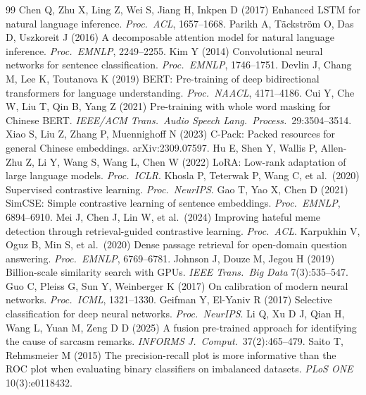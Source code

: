 \documentclass[11pt]{article}
\begin{document}
\begin{thebibliography}{99}
\small
{} Chen Q, Zhu X, Ling Z, Wei S, Jiang H, Inkpen D (2017)
Enhanced LSTM for natural language inference. \textit{Proc.\ ACL}, 1657--1668.
 Parikh A, T\"ackstr\"om O, Das D, Uszkoreit J (2016) A
decomposable attention model for natural language inference. \textit{Proc.\
EMNLP}, 2249--2255.
 Kim Y (2014) Convolutional neural networks for sentence
classification. \textit{Proc.\ EMNLP}, 1746--1751.
 Devlin J, Chang M, Lee K, Toutanova K (2019) BERT:
Pre-training of deep bidirectional transformers for language understanding.
\textit{Proc.\ NAACL}, 4171--4186.
 Cui Y, Che W, Liu T, Qin B, Yang Z (2021) Pre-training with
whole word masking for Chinese BERT. \textit{IEEE/ACM Trans.\ Audio Speech
Lang.\ Process.}\ 29:3504--3514.
 Xiao S, Liu Z, Zhang P, Muennighoff N (2023) C-Pack: Packed
resources for general Chinese embeddings. arXiv:2309.07597.
 Hu E, Shen Y, Wallis P, Allen-Zhu Z, Li Y, Wang S, Wang L,
Chen W (2022) LoRA: Low-rank adaptation of large language models.
\textit{Proc.\ ICLR}.
 Khosla P, Teterwak P, Wang C, et al.\ (2020) Supervised
contrastive learning. \textit{Proc.\ NeurIPS}.
 Gao T, Yao X, Chen D (2021) SimCSE: Simple contrastive
learning of sentence embeddings. \textit{Proc.\ EMNLP}, 6894--6910.
\bibitem{mei2024} Mei J, Chen J, Lin W, et al.\ (2024) Improving hateful meme
detection through retrieval-guided contrastive learning. \textit{Proc.\ ACL}.
\bibitem{karpukhin2020} Karpukhin V, Oguz B, Min S, et al.\ (2020) Dense
passage retrieval for open-domain question answering. \textit{Proc.\ EMNLP},
6769--6781.
 Johnson J, Douze M, Jegou H (2019) Billion-scale
similarity search with GPUs. \textit{IEEE Trans.\ Big Data} 7(3):535--547.
\bibitem{guo2017} Guo C, Pleiss G, Sun Y, Weinberger K (2017) On calibration of
modern neural networks. \textit{Proc.\ ICML}, 1321--1330.
 Geifman Y, El-Yaniv R (2017) Selective classification for
deep neural networks. \textit{Proc.\ NeurIPS}.
 Li Q, Xu D J, Qian H, Wang L, Yuan M, Zeng D D (2025) A fusion
pre-trained approach for identifying the cause of sarcasm remarks.
\textit{INFORMS J.\ Comput.}\ 37(2):465--479.
 Saito T, Rehmsmeier M (2015) The precision-recall plot is
more informative than the ROC plot when evaluating binary classifiers on
imbalanced datasets. \textit{PLoS ONE} 10(3):e0118432.
\end{thebibliography}
\end{document}
